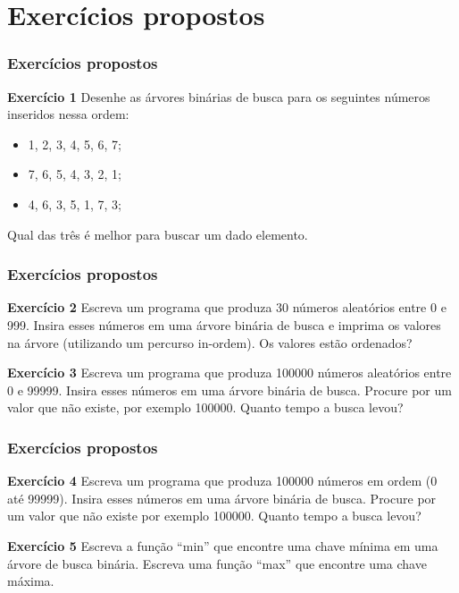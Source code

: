 \documentclass{beamer}
\begin{document}
\section{Exercícios propostos}

\begin{frame}
  \frametitle{Exercícios propostos}

  \textbf{Exercício 1} Desenhe as árvores binárias de busca
  para os seguintes números inseridos nessa ordem:

  \begin{itemize}
    \item 1, 2, 3, 4, 5, 6, 7;
    \item 7, 6, 5, 4, 3, 2, 1;
    \item 4, 6, 3, 5, 1, 7, 3;
  \end{itemize}
  
  Qual das três é melhor para buscar um dado elemento.
\end{frame}

\begin{frame}
  \frametitle{Exercícios propostos}

  \textbf{Exercício 2} Escreva um programa que produza 30
  números aleatórios entre 0 e 999. Insira esses números em
  uma árvore binária de busca e imprima os valores na árvore
  (utilizando um percurso in-ordem). Os valores estão ordenados?

  \vspace{1cm}

  \textbf{Exercício 3} Escreva um programa que produza 100000
  números aleatórios entre 0 e 99999. Insira esses números em uma
  árvore binária de busca. Procure por um valor que não existe,
  por exemplo 100000. Quanto tempo a busca levou?

\end{frame}


\begin{frame}
  \frametitle{Exercícios propostos}

  \textbf{Exercício 4} Escreva um programa que produza 100000
  números em ordem (0 até 99999). Insira esses números em uma
  árvore binária de busca. Procure por um valor que não existe
  por exemplo 100000. Quanto tempo a busca levou?

  \vspace{1cm}

  \textbf{Exercício 5} Escreva a função ``min'' que encontre
  uma chave mínima em uma árvore de busca binária. Escreva uma função
  ``max'' que encontre uma chave máxima.

\end{frame}
\end{document}

